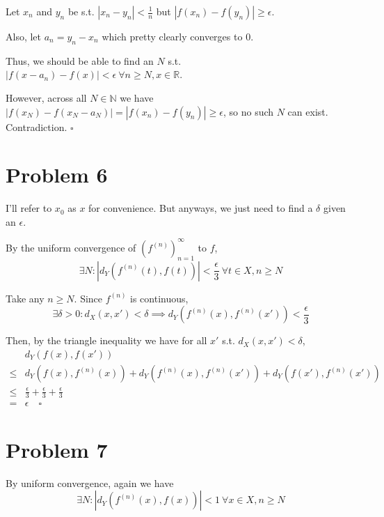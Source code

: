 \documentclass[12pt]{article}
\newcommand{\N}{\mathbb{N}}
\newcommand{\R}{\mathbb{R}}
\begin{document}
Let $x_n$ and $y_n$ be s.t. $|x_n-y_n| < \frac{1}{n}$ but $|f(x_n)-f(y_n)| \ge \epsilon$.

Also, let $a_n=y_n-x_n$ which pretty clearly converges to $0$.

Thus, we should be able to find an $N$ s.t. $|f(x-a_n)-f(x)| < \epsilon\ \forall n \ge N, x \in \R$.

However, across all $N \in \N$ we have $|f(x_N)-f(x_N-a_N)|=|f(x_n)-f(y_n)| \ge \epsilon$,
so no such $N$ can exist. Contradiction. $\square$

\pagebreak

\section{Problem 6}

I'll refer to $x_0$ as $x$ for convenience.
But anyways, we just need to find a $\delta$ given an $\epsilon$.

By the uniform convergence of $\left(f^{(n)}\right)_{n=1}^\infty$ to $f$,
\[\exists N: \left|d_Y\left(f^{(n)}(t), f(t)\right)\right| < \frac{\epsilon}{3}\ \forall t \in X, n \ge N\]

Take any $n \ge N$.
Since $f^{(n)}$ is continuous,
\[\exists \delta > 0: d_X(x, x') < \delta \implies d_Y\left(f^{(n)}(x), f^{(n)}(x')\right) < \frac{\epsilon}{3}\]

Then, by the triangle inequality we have for all $x'$ s.t. $d_X(x, x') < \delta$,
\begin{align*}
        & d_Y(f(x), f(x'))                                                                                                \\
  \le{} & d_Y\left(f(x), f^{(n)}(x)\right) + d_Y\left(f^{(n)}(x), f^{(n)}(x')\right) + d_Y\left(f(x'), f^{(n)}(x')\right) \\
  \le{} & \frac{\epsilon}{3} + \frac{\epsilon}{3} + \frac{\epsilon}{3}                                                    \\
  ={}   & \epsilon\quad\square
\end{align*}

\pagebreak

\section{Problem 7}

By uniform convergence, again we have
\[\exists N: \left|d_Y\left(f^{(n)}(x), f(x)\right)\right| < 1\ \forall x \in X, n \ge N\]
\end{document}
